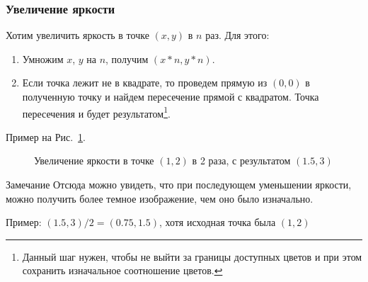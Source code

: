 \subsubsection{Увеличение яркости}

Хотим увеличить яркость в точке $(x, y)$ в $n$ раз.
Для этого:
\begin{enumerate}
    \item Умножим $x$, $y$ на $n$, получим $(x*n, y*n)$.
    \item Если точка лежит не в квадрате, то проведем прямую из $(0, 0)$ в полученную точку и найдем пересечение прямой с квадратом. Точка пересечения и будет результатом\footnote{Данный шаг нужен, чтобы не выйти за границы доступных цветов и при этом сохранить изначальное соотношение цветов.}.
\end{enumerate}
Пример на Рис.~\ref{fig:upbr}.

\begin{figure}[h!]
    \centering
    \caption{Увеличение яркости в точке $(1, 2)$ в 2 раза, с результатом $(1.5, 3)$}
    \label{fig:upbr}
\end{figure}

\begin{callout}{Замечание}
    Отсюда можно увидеть, что при последующем уменьшении яркости, можно получить более темное изображение, чем оно было изначально.

    Пример:
    $(1.5, 3)/2 = (0.75, 1.5)$, хотя исходная точка была $(1, 2)$
\end{callout}

